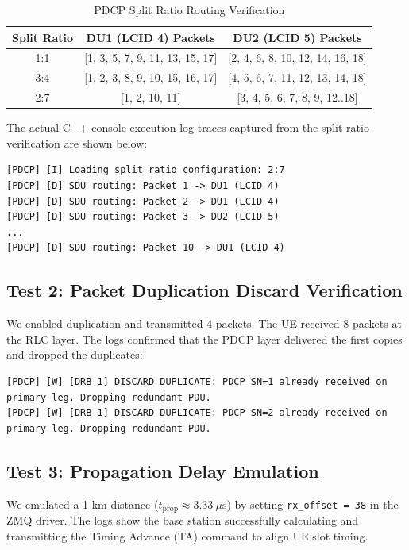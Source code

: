 \documentclass[conference]{IEEEtran}
\begin{document}
\begin{table}[htbp]
\caption{PDCP Split Ratio Routing Verification}
\label{tab:split_results}
\centering
\begin{tabular}{ccc}
\toprule
\textbf{Split Ratio} & \textbf{DU1 (LCID 4) Packets} & \textbf{DU2 (LCID 5) Packets} \\
\midrule
1:1 & [1, 3, 5, 7, 9, 11, 13, 15, 17] & [2, 4, 6, 8, 10, 12, 14, 16, 18] \\
3:4 & [1, 2, 3, 8, 9, 10, 15, 16, 17] & [4, 5, 6, 7, 11, 12, 13, 14, 18] \\
2:7 & [1, 2, 10, 11] & [3, 4, 5, 6, 7, 8, 9, 12..18] \\
\bottomrule
\end{tabular}
\end{table}

The actual C++ console execution log traces captured from the split ratio verification are shown below:
\begin{lstlisting}
[PDCP] [I] Loading split ratio configuration: 2:7
[PDCP] [D] SDU routing: Packet 1 -> DU1 (LCID 4)
[PDCP] [D] SDU routing: Packet 2 -> DU1 (LCID 4)
[PDCP] [D] SDU routing: Packet 3 -> DU2 (LCID 5)
...
[PDCP] [D] SDU routing: Packet 10 -> DU1 (LCID 4)
\end{lstlisting}

\subsection{Test 2: Packet Duplication Discard Verification}
We enabled duplication and transmitted 4 packets. The UE received 8 packets at the RLC layer. The logs confirmed that the PDCP layer delivered the first copies and dropped the duplicates:
\begin{lstlisting}
[PDCP] [W] [DRB 1] DISCARD DUPLICATE: PDCP SN=1 already received on primary leg. Dropping redundant PDU.
[PDCP] [W] [DRB 1] DISCARD DUPLICATE: PDCP SN=2 already received on primary leg. Dropping redundant PDU.
\end{lstlisting}

\subsection{Test 3: Propagation Delay Emulation}
We emulated a 1 km distance ($t_{\text{prop}} \approx 3.33\ \mu\text{s}$) by setting \texttt{rx\_offset = 38} in the ZMQ driver. The logs show the base station successfully calculating and transmitting the Timing Advance (TA) command to align UE slot timing.
\end{document}
